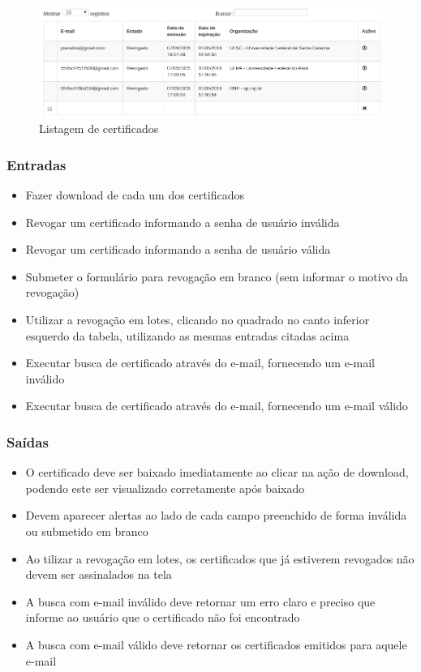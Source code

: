 \begin{figure}[ht]
     \centering
     \includegraphics[scale=0.5]{images/listarcert.png}
     \caption{Listagem de certificados}
     \label{fig:listarcert}
\end{figure}

\subsubsection{Entradas}
\begin{itemize}

	\item Fazer download de cada um dos certificados 
	\item Revogar um certificado informando a senha de usuário inválida
	\item Revogar um certificado informando a senha de usuário válida
	\item Submeter o formulário para revogação em branco (sem informar o motivo da revogação)
	\item Utilizar a revogação em lotes, clicando no quadrado no canto inferior esquerdo da tabela, utilizando as mesmas entradas citadas acima
	\item Executar busca de certificado através do e-mail, fornecendo um e-mail inválido
	\item Executar busca de certificado através do e-mail, fornecendo um e-mail válido
	
\end{itemize}

\subsubsection{Saídas}

\begin{itemize}

	\item O certificado deve ser baixado imediatamente ao clicar na ação de download, podendo este ser visualizado corretamente após baixado
	\item Devem aparecer alertas ao lado de cada campo preenchido de forma inválida ou submetido em branco
	\item Ao tilizar a revogação em lotes, os certificados que já estiverem revogados não devem ser assinalados na tela
	\item A busca com e-mail inválido deve retornar um erro claro e preciso que informe ao usuário que o certificado não foi encontrado
	\item A busca com e-mail válido deve retornar os certificados emitidos para aquele e-mail
	
\end{itemize}

